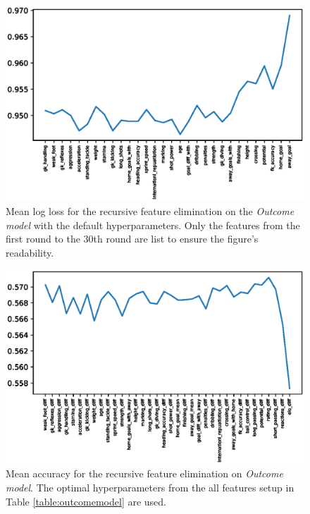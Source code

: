 \begin{figure}[H]
    \centering
    \includegraphics[width=1\textwidth]{img/default_avg_lloss.eps}
    \caption{Mean log loss for the recursive feature elimination on the \textit{Outcome model} with the default hyperparameters. Only the features from the first round to the 30th round are list to ensure the figure's readability.}
    \label{fig:def_avg_loss}
\end{figure}

\begin{figure}[H]
    \centering
    \includegraphics[width=1\textwidth]{img/optimal_avg_accuracy.eps}
    \caption{Mean accuracy for the recursive feature elimination on \textit{Outcome model}. The optimal hyperparameters from the all features setup in Table \ref{table:outcomemodel} are used.}
    \label{fig:optimal_avg_accu}
\end{figure}

